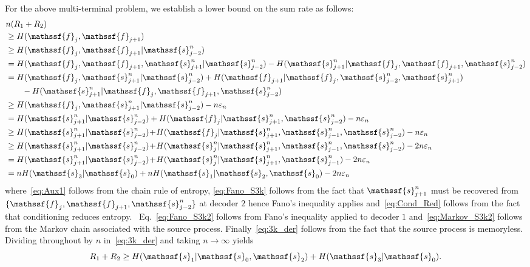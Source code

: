 \documentclass[journal, twocolumn, 10pt]{IEEEtran}
\newcommand{\eps}{\varepsilon}
\newcommand{\rvf}{{\mathssf{f}}}    %
\newcommand{\rvs}{{\mathssf{s}}}    %
\begin{document}
For the above multi-terminal problem, we establish a  lower bound on the sum rate as follows:
\begin{align}
& n(R_1+R_2) \notag \\
&\ge H(\rvf_{j}, \rvf_{j+1}) \notag\\ &\ge H(\rvf_{j},\rvf_{j+1}|\rvs_{j-2}^n)\notag\\
&= H(\rvf_{j}, \rvf_{j+1}, \rvs_{j+1}^n | \rvs_{j-2}^n)- H(\rvs_{j+1}^n | \rvf_{j}, \rvf_{j+1}, \rvs_{j-2}^n)\notag\\
& = H(\rvf_{j}, \rvs_{j+1}^n | \rvs_{j-2}^n) + H(\rvf_{j+1} | \rvf_{j}, \rvs_{j-2}^n, \rvs_{j+1}^n)\notag\\ &\qquad - H(\rvs_{j+1}^n | \rvf_{j}, \rvf_{j+1}, \rvs_{j-2}^n)\label{eq:Aux1}\\
&\ge H(\rvf_{j}, \rvs_{j+1}^n|\rvs_{j-2}^n) - n\eps_n \label{eq:Fano_S3k}\\
&= H(\rvs_{j+1}^n|\rvs_{j-2}^n) + H(\rvf_{j}|\rvs_{j+1}^n, \rvs_{j-2}^n)-n\eps_n\notag\\
&\ge H(\rvs_{j+1}^n|\rvs_{j-2}^n) \!+\! H(\rvf_{j}|\rvs_{j+1}^n, \rvs_{j-1}^n, \rvs_{j-2}^n)-n\eps_n\label{eq:Cond_Red}\\
&\ge H(\rvs_{j+1}^n|\rvs_{j-2}^n) \!+\! H(\rvs^n_{j}|\rvs_{j+1}^n, \rvs_{j-1}^n, \rvs_{j-2}^n)-2n\eps_n\label{eq:Fano_S3k2}\\
&= H(\rvs_{j+1}^n|\rvs_{j-2}^n) \!+\! H(\rvs^n_{j}|\rvs_{j+1}^n, \rvs_{j-1}^n)-2n\eps_n\label{eq:Markov_S3k2}\\
&= nH(\rvs_3|\rvs_0) + nH(\rvs_1 |\rvs_2, \rvs_0) -2n\eps_n \label{eq:3k_der}
\end{align}
where~\eqref{eq:Aux1} follows from the chain rule of entropy, \eqref{eq:Fano_S3k} follows from the fact that $\rvs_{j+1}^n$ must be recovered from $\{\rvf_{j}, \rvf_{j+1}, \rvs_{j-2}^n\}$ at decoder $2$ hence Fano's inequality applies and~\eqref{eq:Cond_Red} follows from the fact that conditioning reduces entropy.%
~Eq.~\eqref{eq:Fano_S3k2} follows from Fano's inequality applied to decoder $1$ and~\eqref{eq:Markov_S3k2} follows from the Markov chain associated with the source process.  Finally~\eqref{eq:3k_der} follows from the fact that the source process is memoryless. Dividing throughout by $n$ in~\eqref{eq:3k_der}  and taking $n\rightarrow\infty$ yields 
\begin{equation}
R_1 +R_2 \ge H(\rvs_1|\rvs_0,\rvs_2) + H(\rvs_3|\rvs_0).\label{eq:SumRateLower}
\end{equation} 
\end{document}
